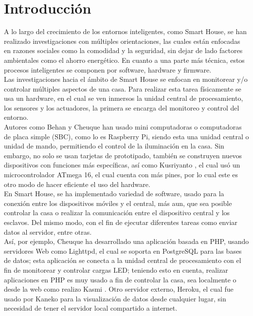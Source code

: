 \chapter{Introducción}

 A lo largo del crecimiento de los entornos inteligentes, como Smart House, se han realizado investigaciones con múltiples orientaciones, las cuales están enfocadas en razones sociales como la comodidad y la seguridad, sin dejar de lado factores ambientales como el ahorro energético. En cuanto a una parte más técnica, estos procesos inteligentes se componen por software, hardware y firmware.\\
 
 Las investigaciones hacia el ámbito de Smart House se enfocan en monitorear y/o controlar múltiples aspectos de una casa. Para realizar esta tarea físicamente se usa un hardware, en el cual se ven inmersos la unidad central de procesamiento, los sensores y los actuadores, la primera se encarga del monitoreo y control del entorno.\\
 
 Autores como Behan \cite{Behan2013} y Cheuque \cite{Cheuque2015} han usado mini computadoras o computadoras de placa simple (SBC), como lo es Raspberry Pi, siendo esta una unidad central o unidad de mando, permitiendo el control de la iluminación en la casa. Sin embargo, no solo se usan tarjetas de prototipado, también se construyen nuevos dispositivos con funciones más específicas, así como Kusriyanto \cite{Kusriyanto2015}, el cual usó un microcontrolador ATmega 16, el cual cuenta con más pines, por lo cual este es otro modo de hacer eficiente el uso del hardware.\\
 
 En Smart House, se ha implementado variedad de software, usado para la conexión entre los dispositivos móviles y el central, más aun, que sea posible controlar la casa o realizar la comunicación entre el dispositivo central y los esclavos. Del mismo modo, con el fin de ejecutar diferentes tareas como enviar datos al servidor, entre otras.\\
 
 Así, por ejemplo, Cheuque \cite{Cheuque2015} ha desarrollado una aplicación basada en PHP, usando servidores Web como Lighttpd, el cual se soporta en PostgreSQL para las bases de datos; esta aplicación se conecta a la unidad central de procesamiento con el fin de monitorear y controlar cargas LED; teniendo esto en cuenta, realizar aplicaciones en PHP es muy usado a fin de controlar la casa, sea localmente o desde la web como realizo Kasmi \cite{Kasmi2016}. Otro servidor externo, Heroku, el cual fue usado por Kaneko \cite{Kaneko2017} para la visualización de datos desde cualquier lugar, sin necesidad de tener el servidor local compartido a internet.\\
 
